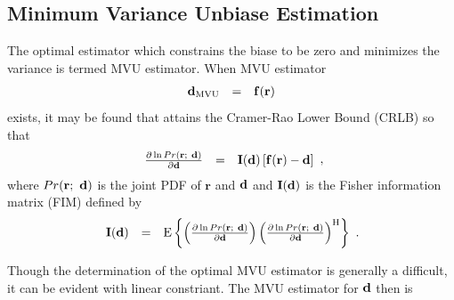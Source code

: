 \documentclass[a4paper,10pt,fleqn, twocolumn]{IEEETran}
\newcommand{\br}{{\mathbf r}}
\newcommand{\bd}{{\bf d}}
\newcommand{\bI}{{\bf I}}
\begin{document}
\subsection{Minimum Variance Unbiase Estimation}
The optimal estimator which constrains the biase to be zero and
minimizes the variance is termed MVU estimator. When MVU estimator
\begin{equation}
\begin{array}{rcl}
{\bd}_{\rm MVU}&=&{\bf f}(\br)
\end{array}
\end{equation}
exists, it may be found that attains the Cramer-Rao Lower Bound
(CRLB) so that
\begin{equation}
\begin{array}{rcl}
\frac{\partial\ln Pr(\br;\ \bd)}{\partial\bd}&=&\bI(\bd)\left[{\bf
f}(\br)-\bd\right]
\end{array},
\end{equation}
\noindent where $Pr(\br;\ \bd)$ is the joint PDF of $\br$ and
$\bd$ and $\bI(\bd)$ is the Fisher information matrix (FIM)
defined by
\begin{equation}\hspace{-0.04in}
\begin{array}{rcl}
$\bI(\bd)$ &=& {\rm E} \left\{ \left( \frac{\partial \ln{Pr(\br;\
\bd)}}{\partial \bd} \right) \left( \frac{\partial \ln{Pr(\br;\
\bd)}}{\partial \bd} \right)^{\rm H} \right\}
\end{array}.
\end{equation}

\noindent Though the determination of the optimal MVU estimator is
generally a difficult, it can be evident with linear constriant.
The MVU estimator for $\bd$ then is~\cite{Key93}
\end{document}
